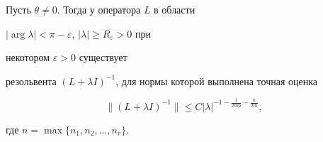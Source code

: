 \begin{thmnonum} 


Пусть $\theta\ne 0$. Тогда у оператора $L$ в области 


$|\arg\lambda|<\pi-\varepsilon$, $|\lambda|\ge R_\varepsilon>0$ при 


некотором $\varepsilon>0$ существует 


резольвента $(L+\lambda I)^{-1}$, для нормы которой выполнена точная оценка 


$$ 


\|(L+\lambda I)^{-1}\|\le C|\lambda|^{-1-\frac{1}{2mp}-\frac{n}{2m}}, 


$$ 


где $n=\max\{n_1,n_2,\dotsc,n_r\}$. 


\end{thmnonum} 


 


